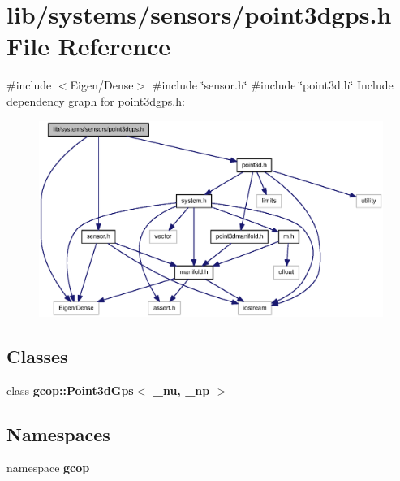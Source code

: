 \section{lib/systems/sensors/point3dgps.h \-File \-Reference}
\label{point3dgps_8h}
{\ttfamily \#include $<$\-Eigen/\-Dense$>$}\*
{\ttfamily \#include \char`\"{}sensor.\-h\char`\"{}}\*
{\ttfamily \#include \char`\"{}point3d.\-h\char`\"{}}\*
\-Include dependency graph for point3dgps.\-h\-:\nopagebreak
\begin{figure}[H]
\begin{center}
\leavevmode
\includegraphics[width=350pt]{point3dgps_8h__incl}
\end{center}
\end{figure}
\subsection*{\-Classes}
\begin{DoxyCompactItemize}
\item 
class {\bf gcop\-::\-Point3d\-Gps$<$ \-\_\-nu, \-\_\-np $>$}
\end{DoxyCompactItemize}
\subsection*{\-Namespaces}
\begin{DoxyCompactItemize}
\item 
namespace {\bf gcop}
\end{DoxyCompactItemize}
